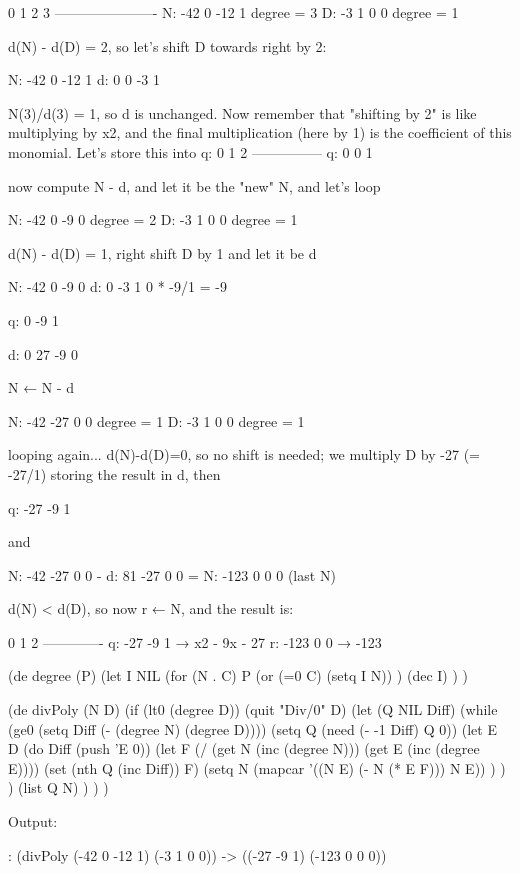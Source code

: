 \begin{wideverbatim}
      0    1    2    3
   ----------------------
N:  -42    0  -12    1        degree = 3
D:   -3    1    0    0        degree = 1

   d(N) - d(D) = 2, so let's shift D towards right by 2:

N:  -42    0  -12    1
d:    0    0   -3    1

   N(3)/d(3) = 1, so d is unchanged. Now remember that "shifting by 2"
   is like multiplying by x2, and the final multiplication
   (here by 1) is the coefficient of this monomial. Let's store this
   into q:
                               0     1     2
                              ---------------
                          q:   0     0     1

   now compute N - d, and let it be the "new" N, and let's loop

N:  -42    0   -9    0        degree = 2
D:   -3    1    0    0        degree = 1

   d(N) - d(D) = 1, right shift D by 1 and let it be d

N:  -42    0   -9    0
d:    0   -3    1    0        * -9/1 = -9

                          q:   0    -9     1

d:    0   27   -9    0        

   N ← N - d

N:  -42  -27    0    0        degree = 1
D:   -3    1    0    0        degree = 1

   looping again... d(N)-d(D)=0, so no shift is needed; we
   multiply D by -27 (= -27/1) storing the result in d, then

                          q:  -27   -9     1

   and

N:  -42  -27    0    0        -
d:   81  -27    0    0        =
N: -123    0    0    0        (last N)

    d(N) < d(D), so now r ← N, and the result is:

       0   1  2
   -------------
q:   -27  -9  1   →  x2 - 9x - 27
r:  -123   0  0   →          -123
\end{wideverbatim}



\begin{wideverbatim}

(de degree (P)
   (let I NIL
      (for (N . C) P
         (or (=0 C) (setq I N)) )
      (dec I) ) )

(de divPoly (N D)
   (if (lt0 (degree D))
      (quit "Div/0" D)
      (let (Q NIL Diff)
         (while (ge0 (setq Diff (- (degree N) (degree D))))
            (setq Q (need (- -1 Diff) Q 0))
            (let E D
               (do Diff (push 'E 0))
               (let F (/ (get N (inc (degree N))) (get E (inc (degree E))))
                  (set (nth Q (inc Diff)) F)
                  (setq N (mapcar '((N E) (- N (* E F))) N E)) ) ) )
         (list Q N) ) ) )

Output:

: (divPoly (-42 0 -12 1) (-3 1 0 0))
-> ((-27 -9 1) (-123 0 0 0))

\end{wideverbatim}

